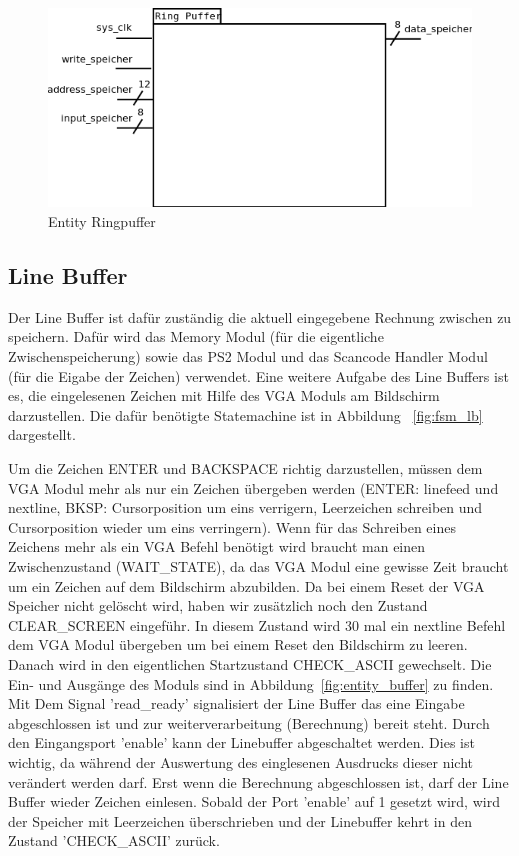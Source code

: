 \begin{figure}[!ht]
	\centering
	\includegraphics[scale=0.5]{figures/entity_speicher.png} 
	\caption{Entity Ringpuffer}
	\label{fig:entity_ring}
\end{figure}

\subsection{Line Buffer}

Der Line Buffer ist dafür zuständig die aktuell eingegebene Rechnung zwischen zu speichern. Dafür wird das Memory Modul (für die eigentliche Zwischenspeicherung) sowie das PS2 Modul und das Scancode Handler Modul (für die Eigabe der Zeichen) verwendet. Eine weitere Aufgabe des Line Buffers ist es, die eingelesenen Zeichen mit Hilfe des VGA Moduls am Bildschirm darzustellen. Die dafür benötigte Statemachine ist in Abbildung ~\ref{fig:fsm_lb} dargestellt. 

Um die Zeichen ENTER und BACKSPACE richtig darzustellen, müssen dem VGA Modul mehr als nur ein Zeichen übergeben werden (ENTER: linefeed und nextline, BKSP: Cursorposition um eins verrigern, Leerzeichen schreiben und Cursorposition wieder um eins verringern). Wenn für das Schreiben eines Zeichens mehr als ein VGA Befehl benötigt wird braucht man einen Zwischenzustand (WAIT\_STATE), da das VGA Modul eine gewisse Zeit braucht um ein Zeichen auf dem Bildschirm abzubilden.
Da bei einem Reset der VGA Speicher nicht gelöscht wird, haben wir zusätzlich noch den Zustand CLEAR\_SCREEN eingeführ. In diesem Zustand wird 30 mal ein nextline Befehl dem VGA Modul übergeben um bei einem Reset den Bildschirm zu leeren. Danach wird in den eigentlichen Startzustand CHECK\_ASCII gewechselt.
Die Ein- und Ausgänge des Moduls sind in Abbildung~\ref{fig:entity_buffer} zu finden. 
Mit Dem Signal 'read\_ready' signalisiert der Line Buffer das eine Eingabe abgeschlossen ist und zur weiterverarbeitung (Berechnung) bereit steht. Durch den Eingangsport 'enable' kann der Linebuffer abgeschaltet werden. Dies ist wichtig, da während der Auswertung des einglesenen Ausdrucks dieser nicht verändert werden darf. Erst wenn die Berechnung abgeschlossen ist, darf der Line Buffer wieder Zeichen einlesen. Sobald der Port 'enable' auf 1 gesetzt wird, wird der Speicher mit Leerzeichen überschrieben und der Linebuffer kehrt in den Zustand 'CHECK\_ASCII' zurück.

